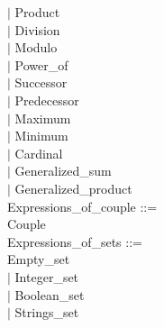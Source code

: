\documentclass[12pt,a4paper,draft]{report}
\begin{document}
{\begin{sloppypar}
\hspace*{0.20in} $|$  Product\\
\hspace*{0.20in} $|$  Division\\
\hspace*{0.20in} $|$  Modulo\\
\hspace*{0.20in} $|$  Power\_of\\
\hspace*{0.20in} $|$  Successor\\
\hspace*{0.20in} $|$  Predecessor\\
\hspace*{0.20in} $|$  Maximum\\
\hspace*{0.20in} $|$  Minimum\\
\hspace*{0.20in} $|$  Cardinal\\
\hspace*{0.20in} $|$  Generalized\_sum\\
\hspace*{0.20in} $|$  Generalized\_product\\
Expressions\_of\_couple ::= \\
\hspace*{0.20in}   Couple\\
Expressions\_of\_sets ::= \\
\hspace*{0.20in}   Empty\_set\\
\hspace*{0.20in} $|$  Integer\_set\\
\hspace*{0.20in} $|$  Boolean\_set\\
\hspace*{0.20in} $|$  Strings\_set\\



\end{sloppypar}}
\end{document}
